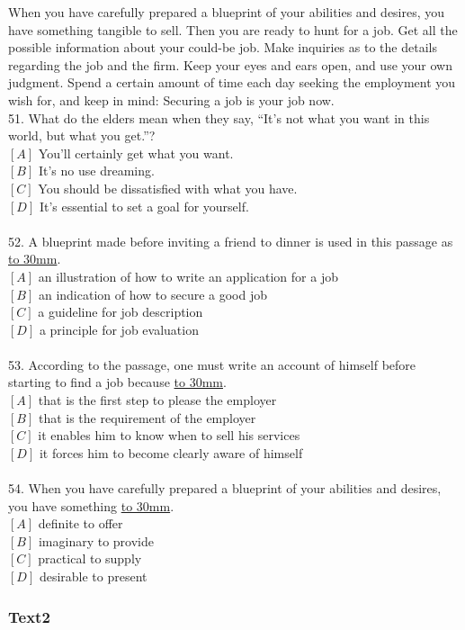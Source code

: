\documentclass[a4paper]{article}
\begin{document}
\par
When you have carefully prepared a blueprint of your abilities and desires, you have something tangible to sell. Then you are ready to hunt for a job. Get all the possible information about your could-be job. Make inquiries as to the details regarding the job and the firm. Keep your eyes and ears open, and use your own judgment. Spend a certain amount of time each day seeking the employment you wish for, and keep in mind: Securing a job is your job now.
\\51.	What do the elders mean when they say, “It’s not what you want in this world, but what you get.”?\\$[A]$ You’ll certainly get what you want.\\$[B]$ It’s no use dreaming.\\$[C]$ You should be dissatisfied with what you have.\\$[D]$ It’s essential to set a goal for yourself.\\\\52.	A blueprint made before inviting a friend to dinner is used in this passage as \underline{\hbox to 30mm{}}.\\$[A]$ an illustration of how to write an application for a job\\$[B]$ an indication of how to secure a good job\\$[C]$ a guideline for job description\\$[D]$ a principle for job evaluation\\\\53.	According to the passage, one must write an account of himself before starting to find a job because \underline{\hbox to 30mm{}}.\\$[A]$ that is the first step to please the employer\\$[B]$ that is the requirement of the employer\\$[C]$ it enables him to know when to sell his services\\$[D]$ it forces him to become clearly aware of himself\\\\54.	When you have carefully prepared a blueprint of your abilities and desires, you have something \underline{\hbox to 30mm{}}.\\$[A]$ definite to offer\\$[B]$ imaginary to provide\\$[C]$ practical to supply\\$[D]$ desirable to present\\\subsubsection{Text2}
\end{document}
